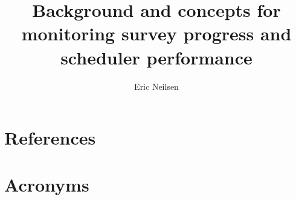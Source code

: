 \documentclass[DM,authoryear,toc]{lsstdoc}
\title{Background and concepts for monitoring survey progress and scheduler performance}
\author{%
Eric Neilsen
}
\date{\vcsDate}
\begin{document}
\maketitle




\appendix
\section{References} \label{sec:bib}
\renewcommand{\refname}{} %


\section{Acronyms} \label{sec:acronyms}

\end{document}
